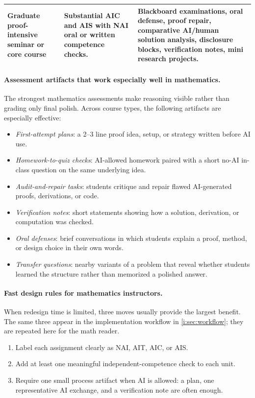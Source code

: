 \documentclass{SIAMbook2023}
\begin{document}
\begin{table}[ht]
\begin{tabularx}{\textwidth}{X X X}
\addlinespace
Graduate proof-intensive seminar or core course & Substantial AIC and AIS with NAI oral or written competence checks. & Blackboard examinations, oral defense, proof repair, comparative AI/human solution analysis, disclosure blocks, verification notes, mini research projects. \\
\bottomrule
\end{tabularx}
\end{table}

\paragraph{Assessment artifacts that work especially well in mathematics.}
The strongest mathematics assessments make reasoning visible rather than grading only final polish. Across course types, the following artifacts are especially effective:

\begin{itemize}
\item \emph{First-attempt plans}: a 2--3 line proof idea, setup, or strategy written before AI use.
\item \emph{Homework-to-quiz checks}: AI-allowed homework paired with a short no-AI in-class question on the same underlying idea.
\item \emph{Audit-and-repair tasks}: students critique and repair flawed AI-generated proofs, derivations, or code.
\item \emph{Verification notes}: short statements showing how a solution, derivation, or computation was checked.
\item \emph{Oral defenses}: brief conversations in which students explain a proof, method, or design choice in their own words.
\item \emph{Transfer questions}: nearby variants of a problem that reveal whether students learned the structure rather than memorized a polished answer.
\end{itemize}

\paragraph{Fast design rules for mathematics instructors.}
When redesign time is limited, three moves usually provide the largest benefit. The same three appear in the implementation workflow in \cref{i:sec:workflow}; they are repeated here for the math reader.

\begin{enumerate}
\item Label each assignment clearly as NAI, AIT, AIC, or AIS.
\item Add at least one meaningful independent-competence check to each unit.
\item Require one small process artifact when AI is allowed: a plan, one representative AI exchange, and a verification note are often enough.
\end{enumerate}
\end{document}
